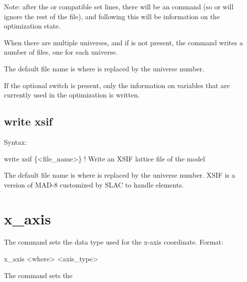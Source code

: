 {{{{{{{{{Note: after the \bmad or \tao compatible set lines, there will be an  command (so \bmad
or \tao will ignore the rest of the file), and following this will be information on the
optimization state.

When there are multiple universes, and if  is not present, the 
command writes a number of files, one for each universe.

The default file name is  where \vn{\#} is replaced by the universe number. 

If the optional  switch is present, only the information on variables that are
currently used in the optimization is written.


\subsection{write xsif}
\label{s:write.xsif}

Syntax:
\begin{example}
    write xsif \{<file_name>\}  ! Write an XSIF lattice file of the model
\end{example}

The default file name is  where \vn{\#} is replaced by the universe number. 
XSIF is a version of MAD-8 customized by SLAC to handle  elements.


\section{x_axis}
\label{s:x.axis}

The  command sets the data type used for the x-axis coordinate. Format:
\begin{example}
  x_axis <where> <axis_type>
\end{example}

\vskip 7pt 

The  command sets the \vn{plot%
for the horizontal axis. Possibilities for \vn{<axis_type>} are:
\begin{example}
  index     -- Use data index
  ele_index -- Use data element index
  s         -- Use longitudinal position.
\end{example}
Note that \vn{index} only makes sense for data that has an index associated with it.

}}}}}}}}}}

